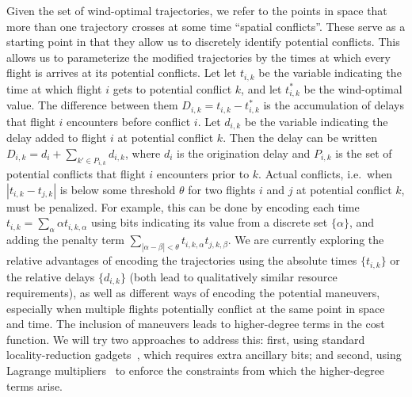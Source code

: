 Given the set of wind-optimal trajectories, we refer to the points in space that more than one trajectory crosses at some time ``spatial conflicts''.
These serve as a starting point in that they allow us to discretely identify potential conflicts.
This allows us to parameterize the modified trajectories by the times at which every flight is arrives at its potential conflicts.
Let let $t_{i,k}$ be the variable indicating the time at which flight $i$ gets to potential conflict $k$, and let $t_{i,k}^*$ be the wind-optimal value.
The difference between them $D_{i,k} = t_{i,k} - t^*_{i,k}$ is the accumulation of delays that flight $i$ encounters before conflict $i$.
Let $d_{i,k}$ be the variable indicating the delay added to flight $i$ at potential conflict $k$.
Then the delay can be written $D_{i,k} = d_i + \sum_{k' \in P_{i,k}} d_{i,k}$, where $d_i$ is the origination delay and $P_{i,k}$ is the set of potential conflicts that flight $i$ encounters prior to $k$.
Actual conflicts, i.e.\ when $|t_{i,k} - t_{j,k}|$ is below some threshold $\theta$ for two flights $i$ and $j$ at potential conflict $k$, must be penalized.
For example, this can be done by encoding each time $t_{i,k} = \sum_{\alpha} \alpha t_{i,k,\alpha}$ using bits indicating its value from a discrete set $\{\alpha\}$, and adding the penalty term $\sum_{|\alpha - \beta| < \theta} t_{i,k,\alpha} t_{j,k,\beta}$.
We are currently exploring the relative advantages of encoding the trajectories using the absolute times $\{t_{i,k}\}$ or the relative delays $\{d_{i,k}\}$ (both lead to qualitatively similar resource requirements), as well as different ways of encoding the potential maneuvers, especially when multiple flights potentially conflict at the same point in space and time.
The inclusion of maneuvers leads to higher-degree terms in the cost function.
We will try two approaches to address this: first, using standard locality-reduction gadgets~\cite{babbush:13}, which requires extra ancillary bits; and second, using Lagrange multipliers~\cite{ronagh:15} to enforce the constraints from which the higher-degree terms arise.
